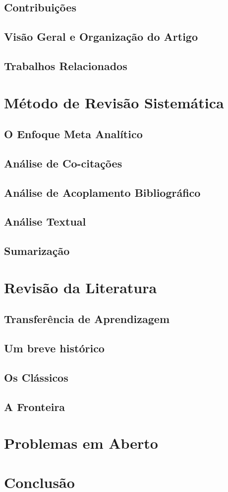 \documentclass[sigconf]{acmart}
\begin{document}
  \subsection{Contribuições}
  \subsection{Visão Geral e Organização do Artigo}
  \subsection{Trabalhos Relacionados}
\section{Método de Revisão Sistemática}
  \subsection{O Enfoque Meta Analítico}
  \subsection{Análise de Co-citações}
  \subsection{Análise de Acoplamento Bibliográfico}
  \subsection{Análise Textual}
  \subsection{Sumarização}
\section{Revisão da Literatura}
  \subsection{Transferência de Aprendizagem}
  \subsection{Um breve histórico}
  \subsection{Os Clássicos}
  \subsection{A Fronteira}
\section{Problemas em Aberto}
\section{Conclusão}


\end{document}
